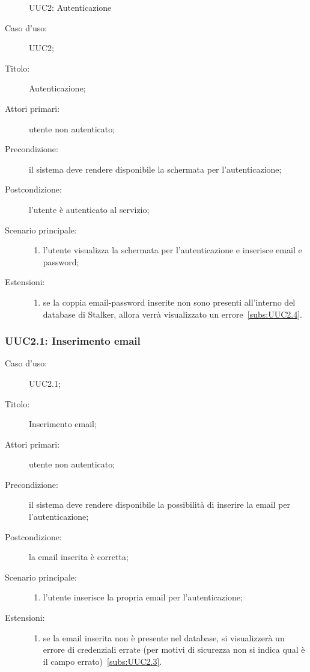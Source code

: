 \documentclass[../../../analisi-dei-requisiti.tex]{subfiles}
\begin{document}
\begin{figure}[H]
  \centering
  \caption{UUC2: Autenticazione}%
  \label{fig:uuc2}
\end{figure}

\begin{description}
  \item[Caso d’uso:] UUC2;
  \item[Titolo:] Autenticazione;
  \item[Attori primari:] utente non autenticato;
  \item[Precondizione:] il sistema deve rendere disponibile la schermata per l'autenticazione;
  \item[Postcondizione:] l'utente è autenticato al servizio;
  \item[Scenario principale:]
        \begin{enumerate}
          \item l'utente visualizza la schermata per l'autenticazione e inserisce email e password;
        \end{enumerate}
  \item[Estensioni:]
        \begin{enumerate}
          \item se la coppia email-password inserite non sono presenti all'interno del database di Stalker, allora verrà visualizzato un errore~\ref{subs:UUC2.4}.
        \end{enumerate}
\end{description}



\subsubsection{UUC2.1: Inserimento email}%
\label{subs:UUC2.1}
\begin{description}
  \item[Caso d’uso:] UUC2.1;
  \item[Titolo:] Inserimento email;
  \item[Attori primari:] utente non autenticato;
  \item[Precondizione:] il sistema deve rendere disponibile la possibilità di inserire la email per l'autenticazione;
  \item[Postcondizione:] la email inserita è corretta;
  \item[Scenario principale:]
        \begin{enumerate}
          \item l'utente inserisce la propria email per l'autenticazione;
        \end{enumerate}
  \item[Estensioni:]
        \begin{enumerate}
          \item se la email inserita non è presente nel database, si visualizzerà un errore di credenziali errate (per motivi di sicurezza non si indica qual è il campo errato)~\ref{subs:UUC2.3}.
        \end{enumerate}
\end{description}
\end{document}
